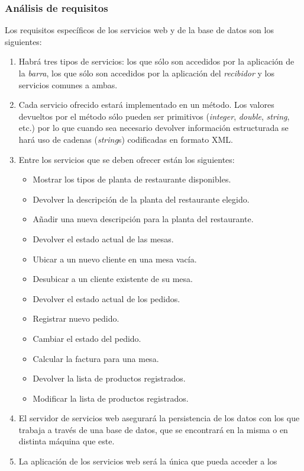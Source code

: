 \subsubsection{Análisis de requisitos}
Los requisitos específicos de los servicios web y de la base de datos son
los siguientes:
\begin{enumerate}
\item Habrá tres tipos de servicios: los que sólo son accedidos por la
aplicación de la \emph{barra}, los que sólo son accedidos por la aplicación
del \emph{recibidor} y los servicios comunes a ambas.
\item Cada servicio ofrecido estará implementado en un método. Los valores
devueltos por el método sólo pueden ser primitivos (\emph{integer},
\emph{double}, \emph{string}, etc.) por lo que cuando sea necesario devolver
información estructurada se hará uso de cadenas (\emph{string}s) codificadas
en formato \acs{XML}.
\item Entre los servicios que se deben ofrecer están los siguientes:
  \begin{itemize}
  \item Mostrar los tipos de planta de restaurante disponibles.
  \item Devolver la descripción de la planta del restaurante elegido.
  \item Añadir una nueva descripción para la planta del restaurante.
  \item Devolver el estado actual de las mesas.
  \item Ubicar a un nuevo cliente en una mesa vacía.
  \item Desubicar a un cliente existente de su mesa.
  \item Devolver el estado actual de los pedidos.
  \item Registrar nuevo pedido.
  \item Cambiar el estado del pedido.
  \item Calcular la factura para una mesa.
  \item Devolver la lista de productos registrados.
  \item Modificar la lista de productos registrados.
  \end{itemize}
\item El servidor de servicios web asegurará la persistencia de los datos con
los que trabaja a través de una base de datos, que se encontrará en la misma
o en distinta máquina que este.
\item La aplicación de los servicios web será la única que pueda acceder a los

\end{enumerate}
